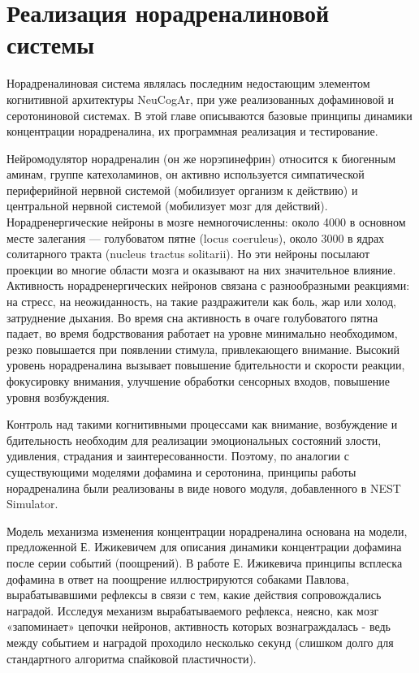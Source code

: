 \chapter{Реализация норадреналиновой системы}
\label{chap:specification}
Норадреналиновая система являлась последним недостающим элементом когнитивной архитектуры NeuCogAr, при уже реализованных дофаминовой и серотониновой системах. В этой главе описываются базовые принципы динамики концентрации норадреналина, их программная реализация и тестирование.

Нейромодулятор норадреналин (он же норэпинефрин) относится к биогенным аминам, группе катехоламинов, он активно используется симпатической периферийной нервной системой (мобилизует организм к действию) и центральной нервной системой (мобилизует мозг для действий).\cite{noradrenalin3} Норадренергические нейроны в мозге немногочисленны: около 4000 в основном месте залегания — голубоватом пятне (locus coeruleus), около 3000 в ядрах солитарного тракта (nucleus tractus solitarii).\cite{masuko, rat_data5} Но эти нейроны посылают проекции во многие области мозга и оказывают на них значительное влияние. Активность норадренергических нейронов связана с разнообразными реакциями: на стресс, на неожиданность, на такие раздражители как боль, жар или холод, затруднение дыхания. Во время сна активность в очаге голубоватого пятна падает, во время бодрствования работает на уровне минимально необходимом, резко повышается при появлении стимула, привлекающего внимание.\cite{Berridge2003} Высокий уровень норадреналина вызывает повышение бдительности и скорости реакции, фокусировку внимания, улучшение обработки сенсорных входов, повышение уровня возбуждения.


Контроль над такими когнитивными процессами как внимание, возбуждение и бдительность необходим для реализации эмоциональных состояний злости, удивления, страдания и заинтересованности. Поэтому, по аналогии с существующими моделями дофамина и серотонина, принципы работы норадреналина были реализованы в виде нового модуля, добавленного в NEST Simulator.


Модель механизма изменения концентрации норадреналина основана на модели, предложенной Е. Ижикевичем для описания динамики концентрации дофамина после серии событий (поощрений).\cite{izhikevich} В работе Е. Ижикевича принципы всплеска дофамина в ответ на поощрение иллюстрируются собаками Павлова, вырабатывавшими рефлексы в связи с тем, какие действия сопровождались наградой. Исследуя механизм вырабатываемого рефлекса, неясно, как мозг «запоминает» цепочки нейронов, активность которых вознаграждалась - ведь между событием и наградой проходило несколько секунд (слишком долго для стандартного алгоритма спайковой пластичности).


